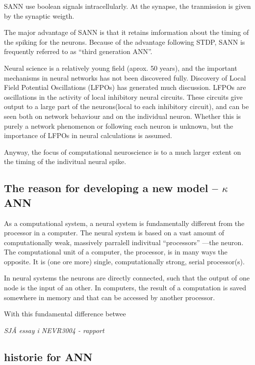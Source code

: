 SANN use boolean signals intracellularly. At the synapse, the tranmission is given by the synaptic weigth. 

The major advantage of SANN is that it retains imformation about the timing of the spiking for the neurons. 
Because of the advantage following STDP, SANN is frequently referred to as ``third generation ANN''. 

Neural science is a relatively young field (aprox. 50 years), and the important mechanisms in neural networks has not been discovered fully. 
Discovery of Local Field Potential Oscillations (LFPOs) has generated much discussion. LFPOs are oscillations in the activity of local inhibitory neural circuits. 
These circuits give output to a large part of the neurons(local to each inhibitory circuit), and can be seen both on network behaviour and on the individual neuron. 
Whether this is purely a network phenomenon or following each neuron is unknown, but the importance of LFPOs in neural calculations is assumed.

Anyway, the focus of computational neuroscience is to a much larger extent on the timing of the indivitual neural spike. 




\subsection{The reason for developing a new model -- $\kappa$ANN}
As a computational system, a neural system is fundamentally different from the processor in a computer. 
The neural system is based on a vast amount of computationally weak, massively parralell indivitual ``processors'' ---the neuron. 
The computational unit of a computer, the processor, is in many ways the opposite. It is (one ore more) single, computationally strong, serial processor(s). 

In neural systems the neurons are directly connected, such that the output of one node is the input of an other. In computers, the result of a computation is saved somewhere in memory and that can be accessed by another processor.

With this fundamental difference betwee



\newpage
		\emph{SJÅ essay i NEVR3004 - rapport}

	\subsection{historie for ANN}


